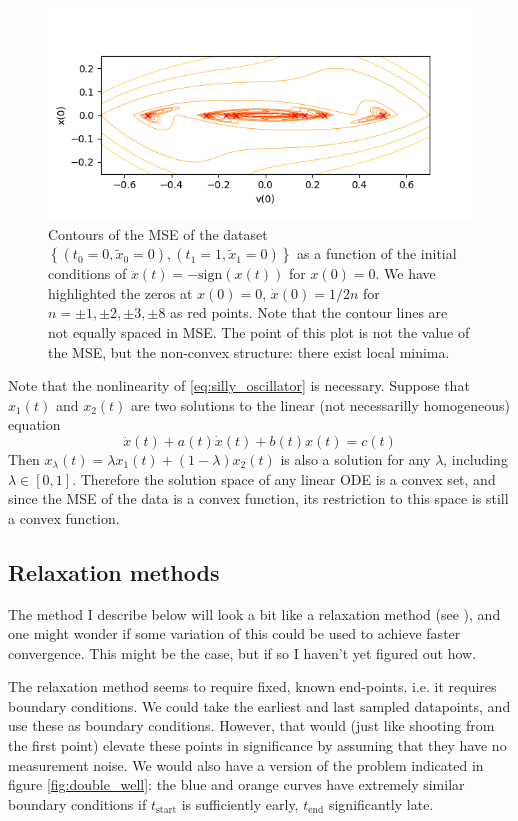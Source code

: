 \documentclass{article}
\begin{document}
\begin{figure}
\includegraphics{images/alternative_methods/Ldata_contours.png}
\centering
\caption{
Contours of the MSE of the dataset $\left\{ (t_0=0, \tilde{x}_0=0), (t_1 = 1, \tilde{x}_1 = 0) \right\}$ as a function of the initial conditions of $\ddot{x}(t) = -\mathrm{sign} (x(t))$ for $x(0) = 0$.
We have highlighted the zeros at $x(0)=0$, $\dot{x}(0) = 1/2n$ for $n=\pm 1, \pm 2, \pm 3, \pm 8$ as red points.
Note that the contour lines are not equally spaced in MSE.
The point of this plot is not the value of the MSE, but the non-convex structure: there exist local minima.
}
\label{fig:Ldata_contours}
\end{figure}

Note that the nonlinearity of \eqref{eq:silly_oscillator} is necessary.
Suppose that $x_1(t)$ and $x_2(t)$ are two solutions to the linear (not necessarilly homogeneous) equation
$$
\ddot{x}(t) + a(t) \dot{x}(t) + b(t) x(t) = c(t)
$$
Then $x_{\lambda}(t) = \lambda x_1(t) + (1-\lambda) x_2(t)$ is also a solution for any $\lambda$, including $\lambda \in \left[0, 1\right]$.
Therefore the solution space of any linear ODE is a convex set, and since the MSE of the data is a convex function, its restriction to this space is still a convex function.


\subsection{Relaxation methods}

The method I describe below will look a bit like a relaxation method (see \cite{wikipediaRelaxationMethod}), and one might wonder if some variation of this could be used to achieve faster convergence.
This might be the case, but if so I haven't yet figured out how.

The relaxation method seems to require fixed, known end-points.
i.e. it requires boundary conditions.
We could take the earliest and last sampled datapoints, and use these as boundary conditions.
However, that would (just like shooting from the first point) elevate these points in significance by assuming that they have no measurement noise.
We would also have a version of the problem indicated in figure \ref{fig:double_well}: the blue and orange curves have extremely similar boundary conditions if $t_{\mathrm{start}}$ is sufficiently early, $t_{\mathrm{end}}$ significantly late.
\end{document}

